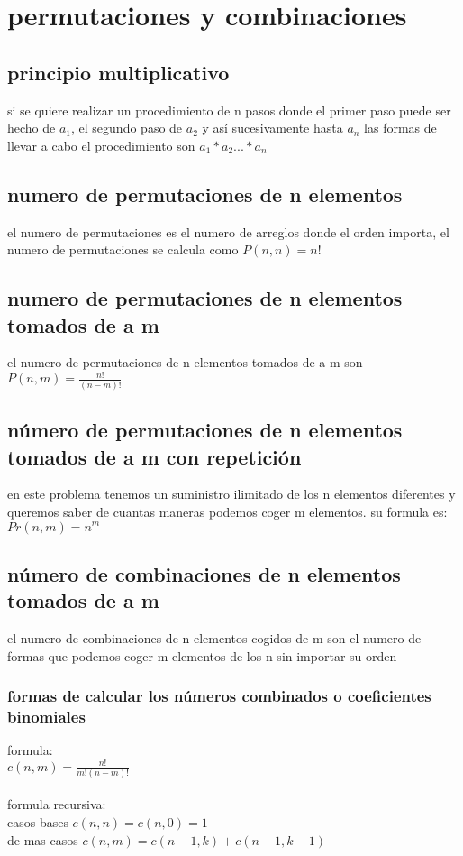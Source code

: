 \documentclass[11pt,a4paper]{book}
\begin{document}
\section{permutaciones y combinaciones}
\subsection{principio multiplicativo}
si se quiere realizar un procedimiento de n pasos donde el primer paso puede ser hecho de $a_{1}$, el segundo paso
de $a_{2}$ y así sucesivamente hasta $a_{n}$ las formas de llevar a cabo el procedimiento son $a_{1}*a_{2} ... *a_{n}$ 
\subsection{numero de permutaciones de n elementos}
el numero de permutaciones es el numero de arreglos donde el orden importa, el numero de permutaciones
se calcula como $P(n,n)=n!$
\subsection{numero de permutaciones de n elementos tomados de a m}
el numero de permutaciones de n elementos tomados de a m son
$P(n,m)=\frac{n!}{\left (n-m  \right )!}$
\subsection{número de permutaciones de n elementos tomados de a m con repetición}
en este problema tenemos un suministro ilimitado de los n elementos diferentes y queremos saber de cuantas maneras podemos coger m elementos. su formula es:
$Pr(n,m)=n^{m}$ 
\subsection{número de combinaciones de n elementos tomados de a m}
el numero de combinaciones de n elementos cogidos de m son el numero de formas que podemos coger m elementos de los n sin importar su orden\\
\subsubsection{formas de calcular los números combinados o coeficientes binomiales}
formula:\\
$c(n,m)=\frac{n!}{m!(n-m)!}$\\
\\
formula recursiva:\\
casos bases $c(n,n)=c(n,0)=1$\\
de mas casos $c(n,m)=c(n-1,k)+c(n-1,k-1)$
\end{document}
